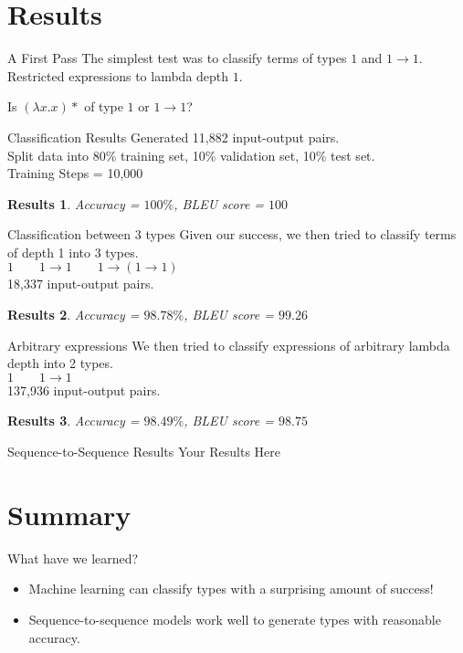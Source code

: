 \documentclass[17pt]{beamer}
\newtheorem{res}{Results}
\begin{document}
\section{Results}

\begin{frame}{A First Pass}
  The simplest test was to classify terms of types $1$ and $1 \to 1$.\\
  Restricted expressions to lambda depth $1$.

  \begin{example}
    Is $(\lambda x. x)*$ of type $1$ or $1 \to 1$?
  \end{example}
\end{frame}

\begin{frame}{Classification Results}
  Generated 11,882 input-output pairs.\\
  Split data into 80\% training set, 10\% validation set, 10\% test set.\\
  Training Steps = 10,000
  \begin{res}
  Accuracy = $100\%$, BLEU score = $100$
  \end{res}
\end{frame}

\begin{frame}{Classification between 3 types}
  Given our success, we then tried to classify terms of depth 1 into
  3 types.\\
  $1 \qquad 1 \to 1 \qquad 1 \to (1 \to 1)$\\
  18,337 input-output pairs.
  \begin{res}
  Accuracy = $98.78\%$, BLEU score = $99.26$
  \end{res}
\end{frame}

\begin{frame}{Arbitrary expressions}
  We then tried to classify expressions of arbitrary lambda depth
  into 2 types.\\
  $1 \qquad 1 \to 1$\\
  137,936 input-output pairs.
  \begin{res}
  Accuracy = $98.49\%$, BLEU score = $98.75$
  \end{res}
\end{frame}

\begin{frame}{Sequence-to-Sequence Results}
  Your Results Here
\end{frame}

\section{Summary}

\begin{frame}{What have we learned?}
  \begin{itemize}
  \item Machine learning can classify types with a surprising amount of
    success!
  \item Sequence-to-sequence models work well to generate types with
    reasonable accuracy.
  \end{itemize}
\end{frame}
\end{document}

